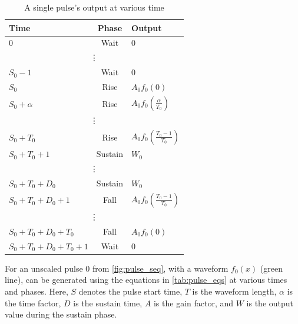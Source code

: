 \begin{table}[ht]
    \setlength{\abovecaptionskip}{5pt}    %
    \setlength{\belowcaptionskip}{5pt}    %
    \centering
    \caption{A single pulse's output at various time}
    \begin{tabularx}{\textwidth}{|X|c|X|}
        \hline
        Time & Phase & Output \\
        \hline
        0&Wait&0\\
        \hline
        \multicolumn{3}{|c|}{\vdots}\\
        \hline
        $S_0-1$&Wait&0\\
        \hline
        $S_0$&Rise&$A_0f_0(0)$\\
        \hline
        $S_0+\alpha$&Rise&$A_0f_0(\frac{\alpha}{T_0})$\\
        \hline
        \multicolumn{3}{|c|}{\vdots}\\
        \hline
        $S_0+T_0$&Rise&$A_0f_0(\frac{T_0-1}{T_0})$\\
        \hline
        $S_0+T_0+1$&Sustain&$W_0$\\
        \hline
        \multicolumn{3}{|c|}{\vdots}\\
        \hline
        $S_0+T_0+D_0$&Sustain&$W_0$\\
        \hline
        $S_0+T_0+D_0+1$&Fall&$A_0f_0(\frac{T_0-1}{T_0})$\\
        \hline
        \multicolumn{3}{|c|}{\vdots}\\
        \hline
        $S_0+T_0+D_0+T_0$&Fall&$A_0f_0(0)$\\
        \hline
        $S_0+T_0+D_0+T_0+1$&Wait&$0$\\
        \hline
    \end{tabularx}
    \label{tab:pulse_eqs}
\end{table}

For an unscaled pulse 0 from \autoref{fig:pulse_seq}, with a waveform \( f_0(x) \) (green line), can be generated using the equations in \autoref{tab:pulse_eqs} at various times and phases. Here, \( S \) denotes the pulse start time, \( T \) is the waveform length, \( \alpha \) is the time factor, \( D \) is the sustain time, \( A \) is the gain factor, and \( W \) is the output value during the sustain phase. 


